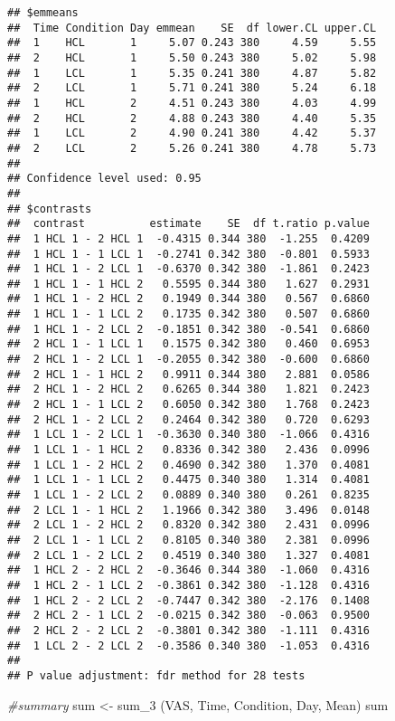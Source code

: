 \documentclass[
]{article}
\newenvironment{Shaded}{\begin{snugshade}}{\end{snugshade}}
\newcommand{\CommentTok}[1]{\textcolor[rgb]{0.56,0.35,0.01}{\textit{#1}}}
\newcommand{\FunctionTok}[1]{\textcolor[rgb]{0.00,0.00,0.00}{#1}}
\newcommand{\NormalTok}[1]{#1}
\newcommand{\OtherTok}[1]{\textcolor[rgb]{0.56,0.35,0.01}{#1}}
\newcommand{\StringTok}[1]{\textcolor[rgb]{0.31,0.60,0.02}{#1}}
\begin{document}
\begin{verbatim}
## $emmeans
##  Time Condition Day emmean    SE  df lower.CL upper.CL
##  1    HCL       1     5.07 0.243 380     4.59     5.55
##  2    HCL       1     5.50 0.243 380     5.02     5.98
##  1    LCL       1     5.35 0.241 380     4.87     5.82
##  2    LCL       1     5.71 0.241 380     5.24     6.18
##  1    HCL       2     4.51 0.243 380     4.03     4.99
##  2    HCL       2     4.88 0.243 380     4.40     5.35
##  1    LCL       2     4.90 0.241 380     4.42     5.37
##  2    LCL       2     5.26 0.241 380     4.78     5.73
## 
## Confidence level used: 0.95 
## 
## $contrasts
##  contrast          estimate    SE  df t.ratio p.value
##  1 HCL 1 - 2 HCL 1  -0.4315 0.344 380  -1.255  0.4209
##  1 HCL 1 - 1 LCL 1  -0.2741 0.342 380  -0.801  0.5933
##  1 HCL 1 - 2 LCL 1  -0.6370 0.342 380  -1.861  0.2423
##  1 HCL 1 - 1 HCL 2   0.5595 0.344 380   1.627  0.2931
##  1 HCL 1 - 2 HCL 2   0.1949 0.344 380   0.567  0.6860
##  1 HCL 1 - 1 LCL 2   0.1735 0.342 380   0.507  0.6860
##  1 HCL 1 - 2 LCL 2  -0.1851 0.342 380  -0.541  0.6860
##  2 HCL 1 - 1 LCL 1   0.1575 0.342 380   0.460  0.6953
##  2 HCL 1 - 2 LCL 1  -0.2055 0.342 380  -0.600  0.6860
##  2 HCL 1 - 1 HCL 2   0.9911 0.344 380   2.881  0.0586
##  2 HCL 1 - 2 HCL 2   0.6265 0.344 380   1.821  0.2423
##  2 HCL 1 - 1 LCL 2   0.6050 0.342 380   1.768  0.2423
##  2 HCL 1 - 2 LCL 2   0.2464 0.342 380   0.720  0.6293
##  1 LCL 1 - 2 LCL 1  -0.3630 0.340 380  -1.066  0.4316
##  1 LCL 1 - 1 HCL 2   0.8336 0.342 380   2.436  0.0996
##  1 LCL 1 - 2 HCL 2   0.4690 0.342 380   1.370  0.4081
##  1 LCL 1 - 1 LCL 2   0.4475 0.340 380   1.314  0.4081
##  1 LCL 1 - 2 LCL 2   0.0889 0.340 380   0.261  0.8235
##  2 LCL 1 - 1 HCL 2   1.1966 0.342 380   3.496  0.0148
##  2 LCL 1 - 2 HCL 2   0.8320 0.342 380   2.431  0.0996
##  2 LCL 1 - 1 LCL 2   0.8105 0.340 380   2.381  0.0996
##  2 LCL 1 - 2 LCL 2   0.4519 0.340 380   1.327  0.4081
##  1 HCL 2 - 2 HCL 2  -0.3646 0.344 380  -1.060  0.4316
##  1 HCL 2 - 1 LCL 2  -0.3861 0.342 380  -1.128  0.4316
##  1 HCL 2 - 2 LCL 2  -0.7447 0.342 380  -2.176  0.1408
##  2 HCL 2 - 1 LCL 2  -0.0215 0.342 380  -0.063  0.9500
##  2 HCL 2 - 2 LCL 2  -0.3801 0.342 380  -1.111  0.4316
##  1 LCL 2 - 2 LCL 2  -0.3586 0.340 380  -1.053  0.4316
## 
## P value adjustment: fdr method for 28 tests
\end{verbatim}

\begin{Shaded}
\begin{Highlighting}[]
\CommentTok{\#summary }
\NormalTok{sum }\OtherTok{\textless{}{-}} \FunctionTok{sum\_3}\NormalTok{ (VAS, }\StringTok{\textquotesingle{}Time\textquotesingle{}}\NormalTok{, }\StringTok{\textquotesingle{}Condition\textquotesingle{}}\NormalTok{, }\StringTok{\textquotesingle{}Day\textquotesingle{}}\NormalTok{, }\StringTok{\textquotesingle{}Mean\textquotesingle{}}\NormalTok{)}
\NormalTok{sum}
\end{Highlighting}
\end{Shaded}
\end{document}
